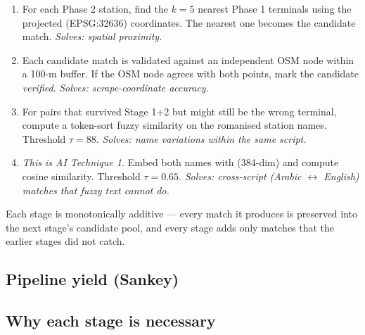 \begin{enumerate}
  \item {} For each Phase 2 station, find the
        $k=5$ nearest Phase 1 terminals using the projected
        (EPSG:32636) coordinates. The nearest one becomes the
        candidate match. \emph{Solves: spatial proximity.}
  \item {} Each candidate match is
        validated against an independent OSM node within a 100-m
        buffer. If the OSM node agrees with both points, mark the
        candidate \emph{verified}. \emph{Solves: scrape-coordinate
        accuracy.}
  \item {} For pairs that survived
        Stage 1+2 but might still be the wrong terminal, compute a
        token-sort fuzzy similarity on the romanised station names.
        Threshold $\tau = 88$. \emph{Solves: name variations within
        the same script.}
  \item {}
        \emph{This is AI Technique 1.} Embed both names with
        (384-dim) and compute cosine similarity. Threshold
        $\tau = 0.65$. \emph{Solves: cross-script (Arabic $\leftrightarrow$
        English) matches that fuzzy text cannot do.}
\end{enumerate}

Each stage is monotonically additive — every match it produces is
preserved into the next stage's candidate pool, and every stage adds
only matches that the earlier stages did not catch.

\subsection{Pipeline yield (Sankey)}


\subsection{Why each stage is necessary}

